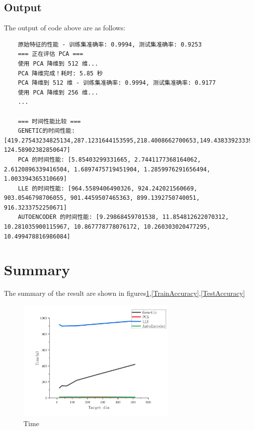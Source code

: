 \documentclass[lang=cn]{elegantpaper}
\begin{document}
\subsection{Output}

The output of code above are as follows:
\begin{lstlisting}
    原始特征的性能 - 训练集准确率: 0.9994, 测试集准确率: 0.9253
    === 正在评估 PCA ===
    使用 PCA 降维到 512 维...
    PCA 降维完成！耗时: 5.85 秒
    PCA 降维到 512 维 - 训练集准确率: 0.9994, 测试集准确率: 0.9177
    使用 PCA 降维到 256 维...
    ...

    === 时间性能比较 ===
    GENETIC的时间性能: [419.27543234825134,287.1231644153595,218.4008662700653,149.43833923339844,152.6374523639679, 124.58902382850647]
    PCA 的时间性能: [5.85403299331665, 2.7441177368164062, 2.6120896339416504, 1.6897475719451904, 1.2859976291656494, 1.003394365310669]
    LLE 的时间性能: [964.5589406490326, 924.242021560669, 903.0546798706055, 901.4459507465363, 899.1392750740051, 916.3233752250671]
    AUTOENCODER 的时间性能: [9.29868459701538, 11.854812622070312, 10.281035900115967, 10.867778778076172, 10.260303020477295, 10.499478816986084]
\end{lstlisting}

\section{Summary}

The summary of the result are shown in figures\ref{TIME},\ref{TrainAccuracy},\ref{TestAccuracy}

\begin{figure}[h]
    \centering
    \includegraphics[width=0.7\textwidth]{TIME.png}
    \caption{Time}
    \label{TIME}
\end{figure}
\end{document}
